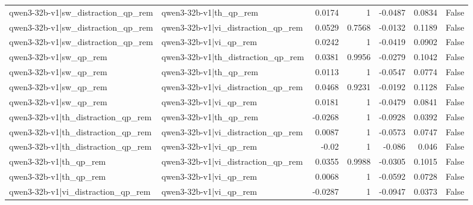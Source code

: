 \begin{table}
\begin{tabular}{l l r r r r l}
qwen3-32b-v1|sw_distraction_qp_rem & qwen3-32b-v1|th_qp_rem & 0.0174 & 1 & -0.0487 & 0.0834 & False \\
qwen3-32b-v1|sw_distraction_qp_rem & qwen3-32b-v1|vi_distraction_qp_rem & 0.0529 & 0.7568 & -0.0132 & 0.1189 & False \\
qwen3-32b-v1|sw_distraction_qp_rem & qwen3-32b-v1|vi_qp_rem & 0.0242 & 1 & -0.0419 & 0.0902 & False \\
qwen3-32b-v1|sw_qp_rem & qwen3-32b-v1|th_distraction_qp_rem & 0.0381 & 0.9956 & -0.0279 & 0.1042 & False \\
qwen3-32b-v1|sw_qp_rem & qwen3-32b-v1|th_qp_rem & 0.0113 & 1 & -0.0547 & 0.0774 & False \\
qwen3-32b-v1|sw_qp_rem & qwen3-32b-v1|vi_distraction_qp_rem & 0.0468 & 0.9231 & -0.0192 & 0.1128 & False \\
qwen3-32b-v1|sw_qp_rem & qwen3-32b-v1|vi_qp_rem & 0.0181 & 1 & -0.0479 & 0.0841 & False \\
qwen3-32b-v1|th_distraction_qp_rem & qwen3-32b-v1|th_qp_rem & -0.0268 & 1 & -0.0928 & 0.0392 & False \\
qwen3-32b-v1|th_distraction_qp_rem & qwen3-32b-v1|vi_distraction_qp_rem & 0.0087 & 1 & -0.0573 & 0.0747 & False \\
qwen3-32b-v1|th_distraction_qp_rem & qwen3-32b-v1|vi_qp_rem & -0.02 & 1 & -0.086 & 0.046 & False \\
qwen3-32b-v1|th_qp_rem & qwen3-32b-v1|vi_distraction_qp_rem & 0.0355 & 0.9988 & -0.0305 & 0.1015 & False \\
qwen3-32b-v1|th_qp_rem & qwen3-32b-v1|vi_qp_rem & 0.0068 & 1 & -0.0592 & 0.0728 & False \\
qwen3-32b-v1|vi_distraction_qp_rem & qwen3-32b-v1|vi_qp_rem & -0.0287 & 1 & -0.0947 & 0.0373 & False \\
\bottomrule
\end{tabular}
\end{table}
